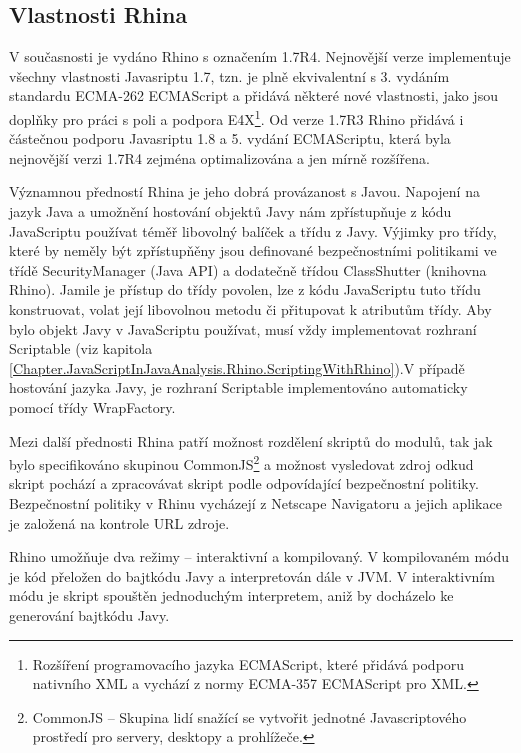 \subsection{Vlastnosti Rhina}
\label{Chapter.JavaScriptInJavaAnalysis.Rhino.RhinoFeatures}

V současnosti je vydáno Rhino s označením 1.7R4. Nejnovější verze implementuje všechny vlastnosti Javasriptu 1.7, tzn. je plně ekvivalentní s 3. vydáním standardu ECMA-262 ECMAScript a přidává některé nové vlastnosti, jako jsou doplňky pro práci s poli a podpora E4X\footnote{Rozšíření programovacího jazyka ECMAScript, které přidává podporu nativního XML a vychází z normy ECMA-357 ECMAScript pro XML.}. Od verze 1.7R3 Rhino přidává i částečnou podporu Javasriptu 1.8 a 5. vydání ECMAScriptu, která byla nejnovější verzi 1.7R4 zejména optimalizována a jen mírně rozšířena. \cite{Bibliography.Rhino.v17R3,Bibliography.Rhino.v17R4}

Významnou předností Rhina je jeho dobrá provázanost s Javou. Napojení na jazyk Java a umožnění hostování objektů Javy nám zpřístupňuje z kódu JavaScriptu používat téměř libovolný balíček a třídu z Javy. Výjimky pro třídy, které by neměly být zpřístupňěny jsou definované bezpečnostními politikami ve třídě SecurityManager (Java API) a dodatečně třídou ClassShutter (knihovna Rhino). Jamile je přístup do třídy povolen, lze z kódu JavaScriptu tuto třídu konstruovat, volat její libovolnou metodu či přitupovat k atributům třídy. Aby bylo objekt Javy v JavaScriptu používat, musí vždy implementovat rozhraní Scriptable (viz kapitola \ref{Chapter.JavaScriptInJavaAnalysis.Rhino.ScriptingWithRhino}).V případě hostování jazyka Javy, je rozhraní Scriptable implementováno automaticky pomocí třídy WrapFactory. 

Mezi další přednosti Rhina patří možnost rozdělení skriptů do modulů, tak jak bylo specifikováno skupinou CommonJS\footnote{CommonJS -- Skupina lidí snažící se vytvořit jednotné Javascriptového prostředí pro servery, desktopy a prohlížeče.} a možnost vysledovat zdroj odkud skript pochází a zpracovávat skript podle odpovídající bezpečnostní politiky. Bezpečnostní politiky v Rhinu vycházejí z Netscape Navigatoru a jejich aplikace je založená na kontrole URL zdroje. \cite{Bibliography.Rhino.Overview}

Rhino umožňuje dva režimy -- interaktivní a kompilovaný. V kompilovaném módu je kód přeložen do bajtkódu Javy a interpretován dále v JVM. V interaktivním módu je skript spouštěn jednoduchým interpretem, aniž by docházelo ke generování bajtkódu Javy.

